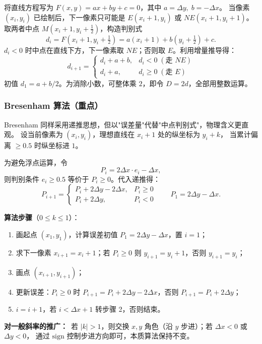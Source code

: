 \documentclass[a4paper,12pt]{ctexart}
\begin{document}
将直线方程写为 $F(x,y)=ax+by+c=0$，其中 $a=\Delta y,\;b=-\Delta x$。
当像素 $(x_i,y_i)$ 已绘制后，下一像素只可能是 $E(x_i+1,y_i)$ 或 $NE(x_i+1,y_i+1)$。
取两者中点 $M(x_i+1, y_i+\tfrac{1}{2})$，构造判别式
\[
    d_i = F(x_i+1, y_i+\tfrac{1}{2}) = a(x_i+1) + b(y_i+\tfrac{1}{2}) + c .
\]
$d_i<0$ 时中点在直线下方，下一像素取 $NE$；否则取 $E$。利用增量推导得：
\[
    d_{i+1} =
    \begin{cases}
        d_i + a + b, & d_i<0\;(\text{走 } NE) \\
        d_i + a,     & d_i\ge 0\;(\text{走 } E)
    \end{cases}
\]
初值 $d_1 = a + b/2$。为消除小数，可整体乘 $2$，即令 $D = 2d$，全部用整数运算。

\subsubsection{Bresenham 算法（重点）}

Bresenham 同样采用递推思想，但以"误差量"代替"中点判别式"，物理含义更直观。
设当前像素为 $(x_i,y_i)$，理想直线在 $x_i+1$ 处的纵坐标为 $y_i+k$，
当累计偏离 $\ge 0.5$ 时纵坐标进 $1$。

为避免浮点运算，令
\[
    P_i = 2\Delta x \cdot e_i - \Delta x ,
\]
则判别条件 $e_i \ge 0.5$ 等价于 $P_i \ge 0$。代入递推得：
\[
    P_{i+1} =
    \begin{cases}
        P_i + 2\Delta y - 2\Delta x, & P_i \ge 0 \\
        P_i + 2\Delta y,             & P_i < 0
    \end{cases}
    \qquad
    P_1 = 2\Delta y - \Delta x.
\]

\textbf{算法步骤}（$0\le k\le 1$）：
\begin{enumerate}[leftmargin=2em,itemsep=0.2em]
    \item 画起点 $(x_1,y_1)$，计算误差初值 $P_1 = 2\Delta y - \Delta x$，置 $i=1$；
    \item 求下一像素 $x_{i+1}=x_i+1$；若 $P_i \ge 0$ 则 $y_{i+1}=y_i+1$，否则 $y_{i+1}=y_i$；
    \item 画点 $(x_{i+1}, y_{i+1})$；
    \item 更新误差：$P_i \ge 0$ 时 $P_{i+1}=P_i+2\Delta y-2\Delta x$，否则 $P_{i+1}=P_i+2\Delta y$；
    \item $i=i+1$，若 $i<\Delta x+1$ 转步骤 2，否则结束。
\end{enumerate}

\textbf{对一般斜率的推广：}\ 若 $|k|>1$，则交换 $x,y$ 角色（沿 $y$ 步进）；若 $\Delta x<0$ 或 $\Delta y<0$，
通过 $\mathrm{sign}$ 控制步进方向即可，本质算法保持不变。
\end{document}
